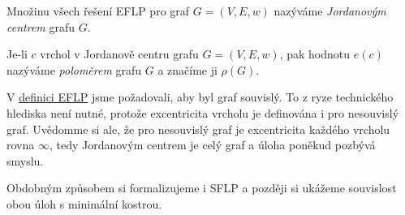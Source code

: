 \begin{definition}
\label{def:jordanovo-centrum}
 Množinu všech řešení EFLP pro graf $G = (V,E,w)$ nazýváme \emph{Jordanovým
 centrem} grafu $G$.
\end{definition}

\begin{definition}
\label{def:polomer-grafu}
 Je-li $c$ vrchol v Jordanově centru grafu $G = (V,E,w)$, pak hodnotu $e(c)$
 nazýváme \emph{poloměrem} grafu $G$ a značíme ji $\rho(G)$.
\end{definition}

\begin{remark}
 V \hyperref[def:eflp]{definici EFLP} jsme požadovali, aby byl graf souvislý.
 To z ryze technického hlediska není nutné, protože excentricita vrcholu je
 definována i pro nesouvislý graf. Uvědomme si ale, že pro nesouvislý graf je
 excentricita každého vrcholu rovna $\infty$, tedy Jordanovým centrem je celý
 graf a úloha poněkud pozbývá smyslu.
\end{remark}

Obdobným způsobem si formalizujeme i SFLP a později si ukážeme souvislost obou
úloh s minimální kostrou.


